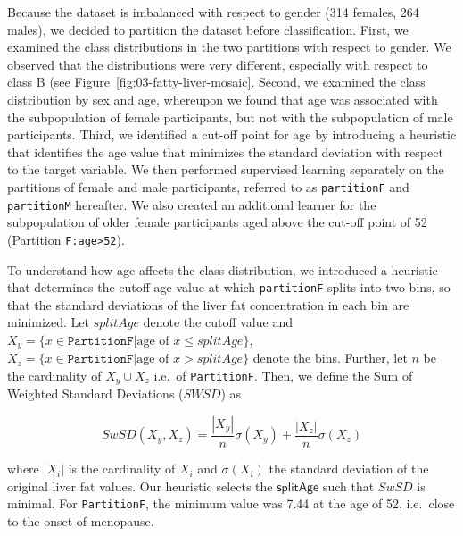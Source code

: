 \documentclass[
  oneside]{book}
\begin{document}
Because the dataset is imbalanced with respect to gender (314 females, 264 males), we decided to partition the dataset before classification.
First, we examined the class distributions in the two partitions with respect to gender.
We observed that the distributions were very different, especially with respect to class B (see Figure~\ref{fig:03-fatty-liver-mosaic}.
Second, we examined the class distribution by sex and age, whereupon we found that age was associated with the subpopulation of female participants, but not with the subpopulation of male participants.
Third, we identified a cut-off point for age by introducing a heuristic that identifies the age value that minimizes the standard deviation with respect to the target variable.
We then performed supervised learning separately on the partitions of female and male participants, referred to as \texttt{partitionF} and \texttt{partitionM} hereafter.
We also created an additional learner for the subpopulation of older female participants aged above the cut-off point of 52 (Partition \texttt{F:age\textgreater{}52}).

To understand how age affects the class distribution, we introduced a heuristic that determines the cutoff age value at which \texttt{partitionF} splits into two bins, so that the standard deviations of the liver fat concentration in each bin are minimized.
Let \(splitAge\) denote the cutoff value and \(X_y=\{x\in\mathtt{PartitionF}|\text{age of } x \leq splitAge\}\), \(X_z=\{x\in\mathtt{PartitionF}|\text{age of } x > splitAge\}\) denote the bins.
Further, let \(n\) be the cardinality of \(X_y\cup{}X_z\) i.e.~of \texttt{PartitionF}.
Then, we define the Sum of Weighted Standard Deviations (\(SWSD\)) as

\begin{equation}
SwSD\left(X_y,X_z\right) = \frac{|X_y|}{n}\sigma({X_y})+\frac{|X_z|}{n}\sigma({X_z})
\label{eq:03-swsd}
\end{equation}

where \(|X_i|\) is the cardinality of \(X_i\) and \(\sigma(X_i)\) the standard deviation of the original liver fat values.
Our heuristic selects the \(\mathsf{splitAge}\) such that \(SwSD\) is minimal.
For \texttt{PartitionF}, the minimum value was 7.44 at the age of 52,
i.e.~close to the onset of menopause.
\end{document}
